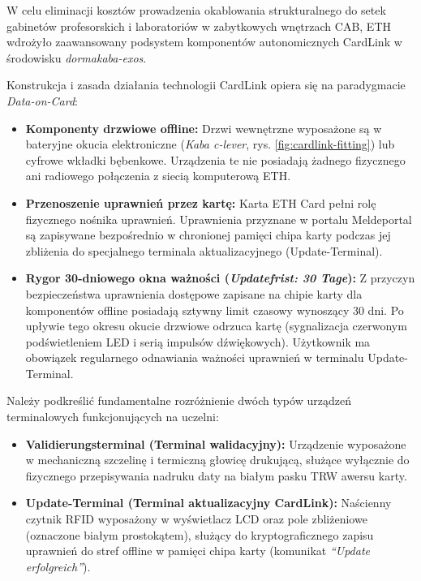 
W celu eliminacji kosztów prowadzenia okablowania strukturalnego do setek gabinetów profesorskich i laboratoriów w zabytkowych wnętrzach CAB, ETH wdrożyło zaawansowany podsystem komponentów autonomicznych CardLink w środowisku \textit{dormakaba-exos}.


Konstrukcja i zasada działania technologii CardLink opiera się na paradygmacie \textit{Data-on-Card}:
\begin{itemize}
    \item \textbf{Komponenty drzwiowe offline:} Drzwi wewnętrzne wyposażone są w bateryjne okucia elektroniczne (\textit{Kaba c-lever}, rys. \ref{fig:cardlink-fitting}) lub cyfrowe wkładki bębenkowe. Urządzenia te nie posiadają żadnego fizycznego ani radiowego połączenia z siecią komputerową ETH.
    \item \textbf{Przenoszenie uprawnień przez kartę:} Karta ETH Card pełni rolę fizycznego nośnika uprawnień. Uprawnienia przyznane w portalu Meldeportal są zapisywane bezpośrednio w chronionej pamięci chipa karty podczas jej zbliżenia do specjalnego terminala aktualizacyjnego (Update-Terminal).
    \item \textbf{Rygor 30-dniowego okna ważności (\textit{Updatefrist: 30 Tage}):} Z przyczyn bezpieczeństwa uprawnienia dostępowe zapisane na chipie karty dla komponentów offline posiadają sztywny limit czasowy wynoszący 30 dni. Po upływie tego okresu okucie drzwiowe odrzuca kartę (sygnalizacja czerwonym podświetleniem LED i serią impulsów dźwiękowych). Użytkownik ma obowiązek regularnego odnawiania ważności uprawnień w terminalu Update-Terminal.
\end{itemize}

Należy podkreślić fundamentalne rozróżnienie dwóch typów urządzeń terminalowych funkcjonujących na uczelni:
\begin{itemize}
    \item \textbf{Validierungsterminal (Terminal walidacyjny):} Urządzenie wyposażone w mechaniczną szczelinę i termiczną głowicę drukującą, służące wyłącznie do fizycznego przepisywania nadruku daty na białym pasku TRW awersu karty.
    \item \textbf{Update-Terminal (Terminal aktualizacyjny CardLink):} Naścienny czytnik RFID wyposażony w wyświetlacz LCD oraz pole zbliżeniowe (oznaczone białym prostokątem), służący do kryptograficznego zapisu uprawnień do stref offline w pamięci chipa karty (komunikat \textit{\enquote{Update erfolgreich}}).
\end{itemize}

